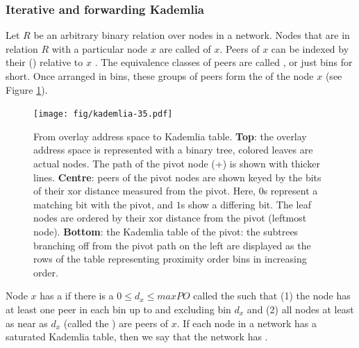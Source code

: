 \subsubsection{Iterative and forwarding Kademlia}

Let $R$ be an arbitrary binary relation over nodes in a network. Nodes that are in relation $R$ with a particular node $x$ are called  of $x$. Peers of $x$ can be indexed by their  () relative to $x$%
.
The equivalence classes of peers are called , or just bins for short. Once arranged in bins, these groups of peers form the  of the node $x$ (see Figure \ref{fig:kademlia-table}). 



\begin{figure}[htbp]
   \centering
    \texttt{[image: fig/kademlia-35.pdf]}
   \caption[From overlay address space to Kademlia table \statusgreen]{From overlay address space to Kademlia table. \textbf{Top}: the overlay address space is represented with a binary tree, colored leaves are actual nodes. The path of the pivot node (+) is shown with thicker lines. \textbf{Centre}: peers of the pivot nodes are shown keyed by the bits of their xor distance measured from the pivot. Here, $0$s represent a matching bit with the pivot, and $1$s show a differing bit. The leaf nodes are ordered by their xor distance from the pivot (leftmost node). \textbf{Bottom}: the Kademlia table of the pivot: the subtrees branching off from the pivot path on the left are displayed as the rows of the table representing proximity order bins in increasing order.}
   \label{fig:kademlia-table}
\end{figure}

Node $x$ has a  if there is a $0\leq d_x\leq \mathit{maxPO}$ called the   such that (1) the node has at least one peer in each bin up to and excluding  bin $d_x$ and (2) all nodes at least as near as $d_x$ (called the ) are peers of $x$. If each node in a network has a saturated Kademlia table, then we say that the network has .

